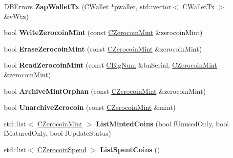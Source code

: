 \begin{DoxyCompactItemize}
\item 
\mbox{\label{class_c_wallet_d_b_a3d6458600538f741a0b05b9788036b56}} 
D\+B\+Errors {\bfseries Zap\+Wallet\+Tx} (\mbox{\hyperlink{class_c_wallet}{C\+Wallet}} $\ast$pwallet, std\+::vector$<$ \mbox{\hyperlink{class_c_wallet_tx}{C\+Wallet\+Tx}} $>$ \&v\+Wtx)
\item 
\mbox{\label{class_c_wallet_d_b_a2464550fd457eb078a44077e5b416e9a}} 
bool {\bfseries Write\+Zerocoin\+Mint} (const \mbox{\hyperlink{class_c_zerocoin_mint}{C\+Zerocoin\+Mint}} \&zerocoin\+Mint)
\item 
\mbox{\label{class_c_wallet_d_b_a50277c729cfe9c74ada9348940555ca7}} 
bool {\bfseries Erase\+Zerocoin\+Mint} (const \mbox{\hyperlink{class_c_zerocoin_mint}{C\+Zerocoin\+Mint}} \&zerocoin\+Mint)
\item 
\mbox{\label{class_c_wallet_d_b_a04e3ab47dad300153ec8acef739e311d}} 
bool {\bfseries Read\+Zerocoin\+Mint} (const \mbox{\hyperlink{class_c_big_num}{C\+Big\+Num}} \&bn\+Serial, \mbox{\hyperlink{class_c_zerocoin_mint}{C\+Zerocoin\+Mint}} \&zerocoin\+Mint)
\item 
\mbox{\label{class_c_wallet_d_b_a77aae06150b1eef721d471a454666df0}} 
bool {\bfseries Archive\+Mint\+Orphan} (const \mbox{\hyperlink{class_c_zerocoin_mint}{C\+Zerocoin\+Mint}} \&zerocoin\+Mint)
\item 
\mbox{\label{class_c_wallet_d_b_a14f4aec1c9be3a6961f5c22b020395f5}} 
bool {\bfseries Unarchive\+Zerocoin} (const \mbox{\hyperlink{class_c_zerocoin_mint}{C\+Zerocoin\+Mint}} \&mint)
\item 
\mbox{\label{class_c_wallet_d_b_a906d7b97c6b94f4225957d576222bbb6}} 
std\+::list$<$ \mbox{\hyperlink{class_c_zerocoin_mint}{C\+Zerocoin\+Mint}} $>$ {\bfseries List\+Minted\+Coins} (bool f\+Unused\+Only, bool f\+Matured\+Only, bool f\+Update\+Status)
\item 
\mbox{\label{class_c_wallet_d_b_a5449bc8b79d73dcbaca52ad9aacde230}} 
std\+::list$<$ \mbox{\hyperlink{class_c_zerocoin_spend}{C\+Zerocoin\+Spend}} $>$ {\bfseries List\+Spent\+Coins} ()

\end{DoxyCompactItemize}
